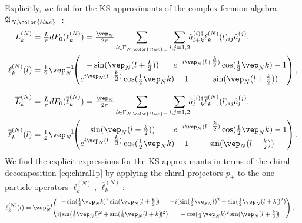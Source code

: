 \documentclass[a4paper, 11pt]{article}
\newcommand{\fA}{\mathfrak{A}}\newcommand{\cA}{\mathcal{A}}\newcommand{\dA}{\mathds{A}}\newcommand{\sA}{\mathscr{A}}
\DeclareMathOperator{\1}{\mathds{1}}
\begin{document}
Explicitly, we find for the KS approximants of the complex fermion algebra $\fA_{N,{\color{blue}\pm}}$:
\begin{align}
\label{eq:latviraD}
L^{(N)}_{k} & = \tfrac{L}{\pi}dF_{0}(\ell^{(N)}_{k}) = \tfrac{\vep_{N}}{2\pi}\sum_{l\in\Gamma_{N,{\color{blue}\pm}}}\sum_{i,j=1,2}\!\!\hat{a}^{(i)\dag}_{l+k}\ell^{(N)}_{k}(l)_{ij}\hat{a}^{(j)}_{l},\\ \nonumber
\ell^{(N)}_{k}(l) & = \tfrac{1}{2}\vep_{N}^{-1}\!\!\begin{pmatrix}\hspace{-1cm} -\sin(\vep_{N}(l+\tfrac{k}{2})) & \hspace{-1cm} e^{-i\vep_{N}(l+\tfrac{k}{2})}\cos(\tfrac{1}{2}\vep_{N}k)-1 \\ e^{i\vep_{N}(l+\tfrac{k}{2})}\cos(\tfrac{1}{2}\vep_{N}k)-1 & -\sin(\vep_{N}(l+\tfrac{k}{2})) \end{pmatrix}, \\[0.25cm] \nonumber
\overline{L}^{(N)}_{k} & = \tfrac{L}{\pi}dF_{0}(\overline{\ell}^{(N)}_{k}) = \tfrac{\vep_{N}}{2\pi}\sum_{l\in\Gamma_{N,{\color{blue}\pm}}}\sum_{i,j=1,2}\!\!\hat{a}^{(i)\dag}_{l-k}\overline{\ell}^{(N)}_{k}(l)_{ij}\hat{a}^{(j)}_{l},\\ \nonumber
\overline{\ell}^{(N)}_{k}(l) & = \tfrac{1}{2}\vep_{N}^{-1}\!\!\begin{pmatrix}\hspace{-1cm} \sin(\vep_{N}(l-\tfrac{k}{2})) & \hspace{-1cm} e^{-i\vep_{N}(l-\tfrac{k}{2})}\cos(\tfrac{1}{2}\vep_{N}k)-1 \\ e^{i\vep_{N}(l-\tfrac{k}{2})}\cos(\tfrac{1}{2}\vep_{N}k)-1 & \sin(\vep_{N}(l-\tfrac{k}{2})) \end{pmatrix}.
\end{align}
We find the explicit expressions for the KS approximants in terms of the chiral decomposition \eqref{eq:chiral1p} by applying the chiral projectors $p_{\pm}$ to the one-particle operators $\ell^{(N)}_{k}$, $\overline{\ell}^{(N)}_{k}$:
\begin{align}
\label{eq:latviraDchi}
\ell^{(N)}_{k}(l) & = \vep_{N}^{-1}\!\!\begin{pmatrix}\hspace{-0.25cm} -\sin(\tfrac{1}{4}\vep_{N}k)^{2}\sin(\vep_{N}(l+\tfrac{k}{2})\!) & \hspace{-0.25cm} -i(\sin(\tfrac{1}{2}\vep_{N}l)^{2}+\sin(\tfrac{1}{2}\vep_{N}(l+k)\!)^{2}) \\[0.25cm] i(\sin(\tfrac{1}{2}\vep_{N}l)^{2}+\sin(\tfrac{1}{2}\vep_{N}(l+k)\!)^{2}) & -\cos(\tfrac{1}{4}\vep_{N}k)^{2}\sin(\vep_{N}(l+\tfrac{k}{2})\!) \end{pmatrix},
\end{align}
\end{document}
